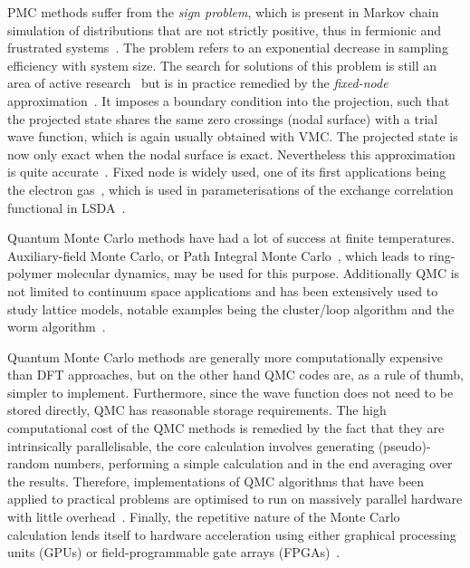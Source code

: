 \documentclass[final,3p,times,twocolumn]{elsarticle}
\begin{document}
	PMC methods suffer from the \emph{sign problem}, which is present in Markov chain simulation of distributions that are not strictly positive, thus in fermionic and frustrated systems~\cite{gubernatis_kawashima_werner_2016}. The problem refers to an exponential decrease in sampling efficiency with system size. The search for solutions of this problem is still an area of active research~\cite{foulkes2001quantum} but is in practice remedied by the \emph{fixed-node} approximation~\cite{anderson1975random}. It imposes a boundary condition into the projection, such that the projected state shares the same zero crossings (nodal surface) with a trial wave function, which is again usually obtained with VMC. The projected state is now only exact when the nodal surface is exact. Nevertheless this approximation is quite accurate~\cite{foulkes2001quantum}. Fixed node is widely used, one of its first applications being the electron gas~\cite{ceperley1980ground}, which is used in parameterisations of the  exchange correlation functional in LSDA~\cite{vosko1980accurate}.
	
	Quantum Monte Carlo methods have had a lot of success at finite temperatures. Auxiliary-field Monte Carlo, or Path Integral Monte Carlo~\cite{ceperley1995path}, which leads to ring-polymer molecular dynamics, may be used for this purpose. Additionally QMC is not limited to continuum space applications and has been extensively used to study lattice models, notable examples being the cluster/loop algorithm and the worm algorithm~\cite{gubernatis_kawashima_werner_2016, prokof1998exact}.
	
	Quantum Monte Carlo methods are generally more computationally expensive than DFT approaches, but on the other hand QMC codes are, as a rule of thumb, simpler to implement. Furthermore, since the wave function does not need to be stored directly, QMC has reasonable storage requirements. The high computational cost of the QMC methods is remedied by the fact that they are intrinsically parallelisable, the core calculation involves generating (pseudo)-random numbers, performing a simple calculation and in the end averaging over the results. Therefore, implementations of QMC algorithms that have been applied to practical problems are optimised to run on massively parallel hardware with little overhead~\cite{needs2020variational}. Finally, the repetitive nature of the Monte Carlo calculation lends itself to hardware acceleration using either graphical processing units (GPUs) or field-programmable gate arrays (FPGAs)~\cite{austin2012quantum}.
		
\end{document}
